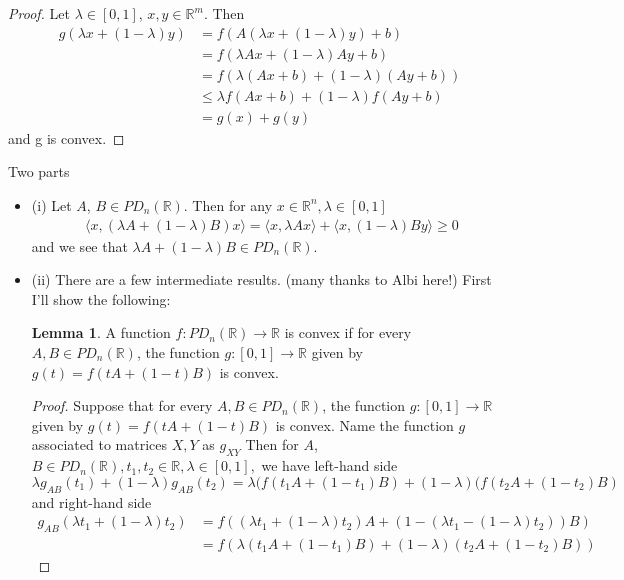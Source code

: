 \documentclass[12pt]{article}
\newenvironment{problem}[2][Problem]{\begin{trivlist}
\item[\hskip \labelsep {\bfseries #1}\hskip \labelsep {\bfseries #2.}]}{\end{trivlist}}
\theoremstyle{definition}
\theoremstyle{definition}
\newtheorem{lemma}{Lemma}[section]
\theoremstyle{definition}
\theoremstyle{definition}
\begin{document}
\begin{problem}{7.8}
\begin{proof}
Let $\lambda \in [0,1]$, $x, y \in \mathbb{R}^m$. Then
\begin{align*}
g(\lambda x + (1-\lambda)y) &= f(A(\lambda x + (1-\lambda)y) + b) \\
&= f(\lambda Ax + (1 - \lambda)Ay + b) \\
&= f(\lambda(Ax + b) + (1 - \lambda)(Ay + b)) \\
& \leq \lambda f(Ax+b) + (1 - \lambda) f(Ay+b) \\
&= g(x) + g(y)
\end{align*}
and g is convex.
\end{proof}
\end{problem}

\begin{problem}{7.12} Two parts 
\begin{itemize}
\item (i) Let $A$, $B \in PD_n(\mathbb{R})$. Then for any $x \in \mathbb{R}^n, \lambda \in [0,1]$
\begin{align*}
\langle x , (\lambda A + (1 - \lambda) B) x \rangle = \langle x, \lambda Ax \rangle + \langle x, (1 - \lambda) B y \rangle \geq 0
\end{align*}
and we see that $\lambda A + (1 - \lambda) B \in PD_n(\mathbb{R})$.
\item (ii) There are a few intermediate results. (many thanks to Albi here!) First I'll show the following:
\begin{lemma} A function $f: PD_n(\mathbb{R}) \rightarrow \mathbb{R} $ is convex if for every $A, B \in PD_n(\mathbb{R})$, the function $g:[0,1] \rightarrow \mathbb{R}$ given by $g(t) = f(tA +  (1-t)B)$ is convex.
\end{lemma}
\begin{proof}
Suppose that for every $A, B \in PD_n(\mathbb{R})$, the function $g:[0,1] \rightarrow \mathbb{R}$ given by $g(t) = f(tA +  (1-t)B)$ is convex. Name the function $g$ associated to matrices $X, Y$ as $g_{XY}$ Then for $A$, $B \in PD_n(\mathbb{R}), t_1, t_2 \in \mathbb{R}, \lambda \in [0,1],$ we have left-hand side
$$\lambda g_{AB}(t_1) + (1 - \lambda) g_{AB}(t_2) = \lambda(f(t_1A +  (1-t_1)B) + (1-\lambda)(f(t_2A +  (1-t_2)B)$$
and right-hand side
\begin{align*}
g_{AB}(\lambda t_1 + (1 - \lambda)t_2) &= f((\lambda t_1 + (1 - \lambda)t_2)A + (1-(\lambda t_1 - (1 - \lambda)t_2))B) \\
&= f(\lambda(t_1A + (1-t_1)B) + (1 - \lambda)(t_2A + (1-t_2)B)) 

\end{align*}
\end{proof}
\end{itemize}
\end{problem}
\end{document}
